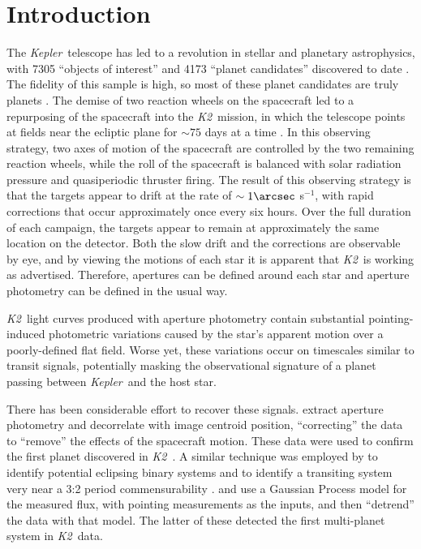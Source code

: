 \documentclass{emulateapj}
\newcommand{\project}[1]{\textsl{#1}}
\newcommand{\kep}{\project{Kepler}}
\newcommand{\KT}{\project{K2}}
\newcommand{\todo}[3]{{\color{#2} \emph{#1} TO DO: #3}}
\newcommand{\btmtodo}[1]{\todo{BEN}{red}{#1}}
\begin{document}
\keywords{\btmtodo{Keywords}}

\maketitle

\section{Introduction}
The \kep\ telescope \citep{Borucki10} has led to a revolution in stellar and planetary
astrophysics, with 7305 ``objects of interest'' and 4173 ``planet candidates''
discovered to date \citep{Borucki11a, Borucki11b, Batalha13, Burke14, Rowe15, Mullaly15}.
The fidelity of this sample is high, so most of these planet candidates are truly planets
\citep{Morton11b, Fressin13}.
The demise of two reaction wheels on the spacecraft led to a repurposing
of the spacecraft into the \KT\ mission, in which the telescope points at
fields near the ecliptic plane for $\sim 75$ days at a time \citep{Howell14}.
In this observing strategy, two axes of motion of the spacecraft are
controlled by the two remaining reaction wheels, while the roll of the
spacecraft is balanced with solar radiation pressure and quasiperiodic
thruster firing.
The result of this observing strategy is that the targets appear to drift
at the rate of $\sim 1\arcsec$ s$^{-1}$, with rapid corrections that occur
approximately once every six hours.
Over the full duration of each campaign, the targets appear to remain at
approximately the same location on the detector.
Both the slow drift and the corrections are observable by eye, and by viewing the
motions of each star \citep{Barentsen15} it is apparent that \KT\ is working as
advertised.
Therefore, apertures can be defined around each star and aperture photometry can be
defined in the usual way.

\KT\ light curves produced with aperture photometry contain substantial pointing-induced
photometric variations caused by the star's apparent motion over a poorly-defined flat
field.
Worse yet, these variations occur on timescales similar to transit signals, potentially
masking the observational signature of a planet passing between \kep\ and the host star.

There has been considerable effort to recover these signals.
\citet{Vanderburg14} extract aperture photometry and decorrelate with image centroid
position, ``correcting'' the data to ``remove'' the effects of the spacecraft motion.
These data were used to confirm the first planet discovered in \KT\ \citep{Vanderburg15}.
A similar technique was employed by \citet{Armstrong15a} to identify potential eclipsing
binary systems and to identify a transiting system very near a 3:2 period commensurability
\citep{Armstrong15b}.
\citet{Aigrain15} and \citet{Crossfield15} use a Gaussian Process model for the measured
flux, with pointing measurements as the inputs, and then “detrend” the data with that model.
The latter of these detected the first multi-planet system in \KT\ data.
\end{document}
